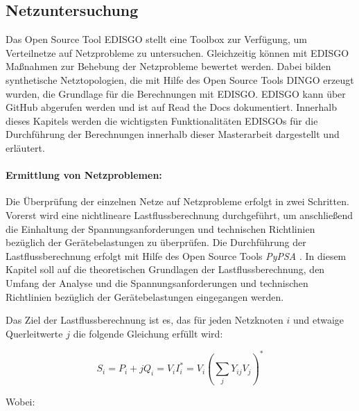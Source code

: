 \subsection{Netzuntersuchung}\label{chap:edisgo_theo}

Das Open Source Tool \gls{EDISGO} stellt eine Toolbox zur Verfügung, um Verteilnetze auf Netzprobleme zu untersuchen.
Gleichzeitig können mit \gls{EDISGO} Maßnahmen zur Behebung der Netzprobleme bewertet werden.
Dabei bilden synthetische Netztopologien, die mit Hilfe des Open Source Tools \gls{DINGO} erzeugt wurden, die Grundlage für die Berechnungen mit \gls{EDISGO}.
\gls{EDISGO} kann über GitHub \cite{edisgoGit2019} abgerufen werden und ist auf Read the Docs \cite{edisgoDocs2017} dokumentiert.
Innerhalb dieses Kapitels werden die wichtigsten Funktionalitäten \glspl{EDISGO} für die Durchführung der Berechnungen innerhalb dieser Masterarbeit dargestellt und erläutert.


\paragraph{Ermittlung von Netzproblemen:}\label{chap:grid_issues}

Die Überprüfung der einzelnen Netze auf Netzprobleme erfolgt in zwei Schritten.
Vorerst wird eine nichtlineare Lastflussberechnung durchgeführt, um anschließend die Einhaltung der Spannungsanforderungen und technischen Richtlinien bezüglich der Gerätebelastungen zu überprüfen.
Die Durchführung der Lastflussberechnung erfolgt mit Hilfe des Open Source Tools \textit{PyPSA} \cite{Brown2020}.
In diesem Kapitel soll auf die theoretischen Grundlagen der Lastflussberechnung, den Umfang der Analyse und die Spannungsanforderungen und technischen Richtlinien bezüglich der Gerätebelastungen eingegangen werden.\medskip

Das Ziel der Lastflussberechnung ist es, das für jeden Netzknoten $i$ und etwaige Querleitwerte $j$ die folgende Gleichung erfüllt wird:

\begin{equation}
	S_i = P_i + j Q_i = V_i I_i^* = V_i \left(\sum_j Y_{ij} V_j \right)^*
	\label{eq:pf}
\end{equation}

\noindent Wobei:


